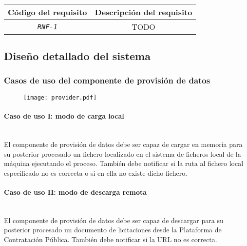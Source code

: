             \begin{center}
                \begin{tabular}{|| c | c ||} 
                    \hline
                    Código del requisito & Descripción del requisito \\
                    \hline\hline
                    \texttt{\textit{RNF-1}} & TODO \\ 
                    \hline
                \end{tabular}
            \end{center}
            
    \vspace{3cm}
    
    \subsection{Diseño detallado del sistema} \label{subsec:detallado}
        \subsubsection{Casos de uso del componente de provisión de datos}
    
            \begin{figure}[h]
                \centering
                \texttt{[image: provider.pdf]}
                \label{fig:provider}
            \end{figure}
            
            \paragraph{Caso de uso I: modo de carga local} \mbox{}\\
                El componente de provisión de datos debe ser capaz de cargar en memoria para su posterior procesado un fichero localizado en el sistema de ficheros local de la máquina ejecutando el proceso. También debe notificar si la ruta al fichero local especificado no es correcta o si en ella no existe dicho fichero.
                
            \paragraph{Caso de uso II: modo de descarga remota} \mbox{}\\
                El componente de provisión de datos debe ser capaz de descargar para su posterior procesado un documento de licitaciones desde la Plataforma de Contratación Pública. También debe notificar si la URL no es correcta.
            
